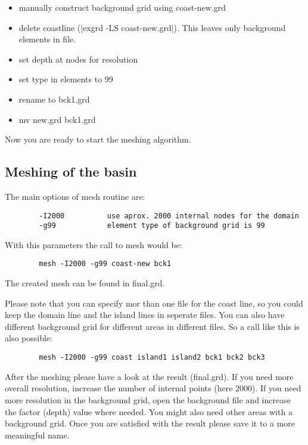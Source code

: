 \begin{itemize}
\item        manually construct background grid using coast-new.grd
\item        delete coastline (|exgrd -LS coast-new.grd|).
		This leaves only background elements in file.
\item        set depth at nodes for resolution
\item        set type in elements to 99 
\item        rename to bck1.grd
\item        mv new.grd bck1.grd
\end{itemize}

Now you are ready to start the meshing algorithm.

\subsection{Meshing of the basin}

The main options of mesh routine are:

\begin{verbatim}
        -I2000          use aprox. 2000 internal nodes for the domain
        -g99            element type of background grid is 99
\end{verbatim}

With this parameters the call to mesh would be:

\begin{verbatim}
        mesh -I2000 -g99 coast-new bck1
\end{verbatim}

The created mesh can be found in final.grd.

Please note that you can specify mor than one file for the coast line,
so you could keep the domain line and the island lines in seperate files.
You can also have different background grid for different areas in
different files. So a call like this is also possible:

\begin{verbatim}
        mesh -I2000 -g99 coast island1 island2 bck1 bck2 bck3
\end{verbatim}

After the meshing please have a look at the result (final.grd).
If you need more overall resolution, increase the number of internal
points (here 2000). If you need more resolution in the background grid,
open the background file and increase the factor (depth) value where needed.
You might also need other areas with a background grid. Once you
are satisfied with the result please save it to a more meaningful name.


